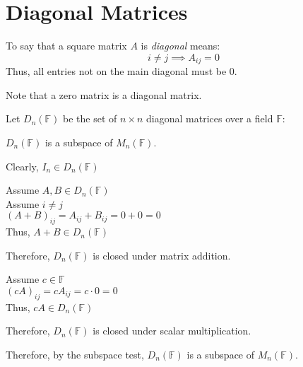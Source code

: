 \documentclass[letterpaper,12pt,fleqn]{article}
\newcommand{\F}{\mathbb{F}}
\newcommand{\Dn}{D_n(\F)}
\newcommand{\Mn}{M_n(\F)}
\begin{document}
\section*{Diagonal Matrices}

\begin{definition}
  To say that a square matrix $A$ is \emph{diagonal} means:
  \[i\ne j\implies A_{ij}=0\]
  Thus, all entries not on the main diagonal must be 0.

  Note that a zero matrix is a diagonal matrix.
\end{definition}

\begin{theorem}
  Let $\Dn$ be the set of $n\times n$ diagonal matrices over a field $\F$:

  $\Dn$ is a subspace of $\Mn$.
\end{theorem}

\begin{theproof}
  Clearly, $I_n\in\Dn$

  Assume $A,B\in\Dn$ \\
  Assume $i\ne j$ \\
  $(A+B)_{ij}=A_{ij}+B_{ij}=0+0=0$ \\
  Thus, $A+B\in\Dn$

  Therefore, $\Dn$ is closed under matrix addition.

  Assume $c\in\F$ \\
  $(cA)_{ij}=cA_{ij}=c\cdot0=0$ \\
  Thus, $cA\in\Dn$

  Therefore, $\Dn$ is closed under scalar multiplication.

  Therefore, by the subspace test, $\Dn$ is a subspace of $\Mn$.
\end{theproof}
\end{document}

